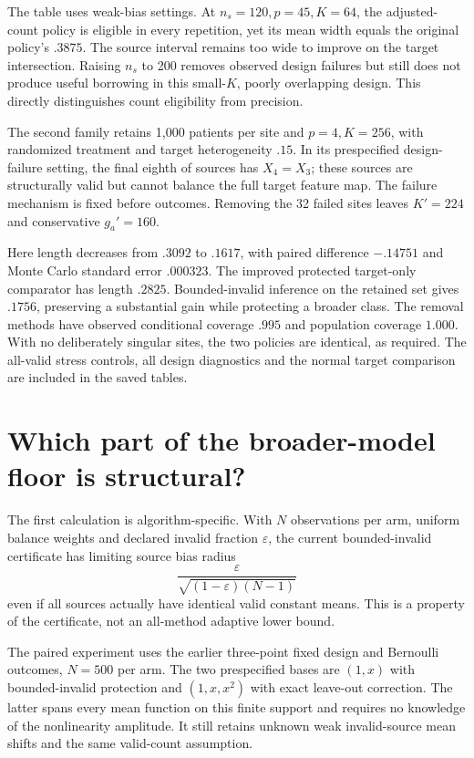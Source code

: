 \documentclass[11pt]{article}
\begin{document}
\begin{center}\small
\resizebox{\linewidth}{!}{}
\end{center}

The table uses weak-bias settings. At $n_s=120,p=45,K=64$, the adjusted-count
policy is eligible in every repetition, yet its mean width equals the original
policy's $.3875$. The source interval remains too wide to improve on the target
intersection. Raising $n_s$ to 200 removes observed design failures but still
does not produce useful borrowing in this small-$K$, poorly overlapping design.
This directly distinguishes count eligibility from precision.

The second family retains 1,000 patients per site and $p=4,K=256$, with
randomized treatment and target heterogeneity $.15$. In its prespecified
design-failure setting, the final eighth of sources has $X_4=X_3$; these
sources are structurally valid but cannot balance the full target feature
map. The failure mechanism is fixed before outcomes. Removing the 32 failed
sites leaves $K'=224$ and conservative $g_a'=160$.

Here length decreases from $.3092$ to $.1617$, with paired difference
$-.14751$ and Monte Carlo standard error $.000323$. The improved protected
target-only comparator has length $.2825$. Bounded-invalid inference on the
retained set gives $.1756$, preserving a substantial gain while protecting a
broader class. The removal methods have observed conditional coverage $.995$
and population coverage $1.000$. With no deliberately singular sites, the two
policies are identical, as required. The all-valid stress controls, all design
diagnostics and the normal target comparison are included in the saved tables.

\section{Which part of the broader-model floor is structural?}

The first calculation is algorithm-specific. With $N$ observations per arm,
uniform balance weights and declared invalid fraction $\varepsilon$, the
current bounded-invalid certificate has limiting source bias radius
\[
 \frac{\varepsilon}{\sqrt{(1-\varepsilon)(N-1)}}
\]
even if all sources actually have identical valid constant means. This is a
property of the certificate, not an all-method adaptive lower bound.

The paired experiment uses the earlier three-point fixed design and Bernoulli
outcomes, $N=500$ per arm. The two prespecified bases are $(1,x)$ with
bounded-invalid protection and $(1,x,x^2)$ with exact leave-out correction.
The latter spans every mean function on this finite support and requires no
knowledge of the nonlinearity amplitude. It still retains unknown weak
invalid-source mean shifts and the same valid-count assumption.
\end{document}
